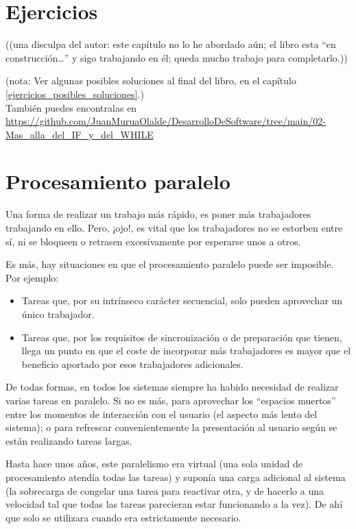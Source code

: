 \documentclass[spanish,12pt,a4paper,final,oneside]{book}
\begin{document}
\chapter{Ejercicios}\label{ejercicios_comunicaciones}

\begin{footnotesize}((una disculpa del autor: este capítulo no lo he abordado aún; el libro esta ``en construcción\ldots'' y sigo trabajando en él; queda mucho trabajo para completarlo.))\end{footnotesize}

(nota: Ver algunas posibles soluciones al final del libro, en el capítulo \ref{ejercicios_posibles_soluciones}.)
\\{\scriptsize También puedes encontralas en \url{https://github.com/JuanMuruaOlalde/DesarrolloDeSoftware/tree/main/02-Mas_alla_del_IF_y_del_WHILE}}


\chapter{Procesamiento paralelo}
Una forma de realizar un trabajo más rápido, es poner más trabajadores trabajando en ello. Pero, ¡ojo!, es vital que los trabajadores no se estorben entre sí, ni se bloqueen o retrasen excesivamente por esperarse unos a otros.

Es más, hay situaciones en que el procesamiento paralelo puede ser imposible. Por ejemplo:
\begin{itemize}
\item Tareas que, por su intrínseco carácter secuencial, solo pueden aprovechar un único trabajador. 
\item Tareas que, por los requisitos de sincronización o de preparación que tienen, llega un punto en que el coste de incorporar más trabajadores es mayor que el beneficio aportado por esos trabajadores adicionales.
\end{itemize}

De todas formas, en todos los sistemas siempre ha habido necesidad de realizar varias tareas en paralelo. Si no es más, para aprovechar los ``espacios muertos'' entre los momentos de interacción con el usuario (el aspecto más lento del sistema); o para refrescar convenientemente la presentación al usuario según se están realizando tareas largas.

Hasta hace unos años, este paralelismo era virtual (una sola unidad de procesamiento atendía todas las tareas) y suponía una carga adicional al sistema (la sobrecarga de congelar una tarea para reactivar otra, y de hacerlo a una velocidad tal que todas las tareas parecieran estar funcionando a la vez). De ahí que solo se utilizara cuando era estrictamente necesario.
\end{document}
